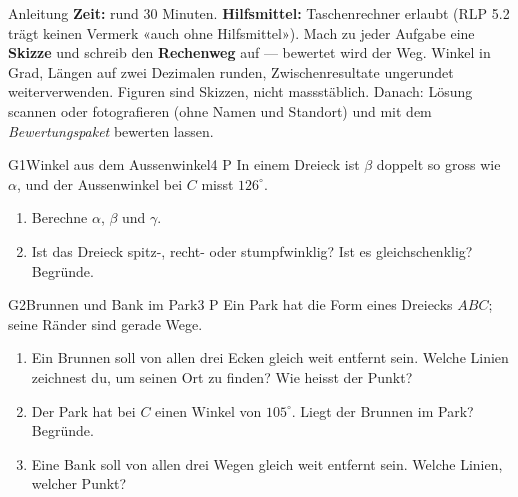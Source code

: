 \documentclass[11pt]{article}
\begin{document}

\begin{lpinfo}{Anleitung}
\textbf{Zeit:} rund 30 Minuten. \textbf{Hilfsmittel:} Taschenrechner erlaubt (RLP 5.2 trägt keinen Vermerk «auch ohne Hilfsmittel»).
Mach zu jeder Aufgabe eine \textbf{Skizze} und schreib den \textbf{Rechenweg} auf — bewertet wird der Weg. Winkel in Grad,
Längen auf zwei Dezimalen runden, Zwischenresultate ungerundet weiterverwenden. Figuren sind Skizzen, nicht massstäblich.
Danach: Lösung scannen oder fotografieren (ohne Namen und Standort) und mit dem \emph{Bewertungspaket} bewerten lassen.
\end{lpinfo}


\begin{lpaufgabe}{G1}{Winkel aus dem Aussenwinkel}{4 P}
In einem Dreieck ist $\beta$ doppelt so gross wie $\alpha$, und der Aussenwinkel bei $C$ misst $126^\circ$.
\begin{enumerate}[label=(\alph*),leftmargin=*,itemsep=2pt]
\item Berechne $\alpha$, $\beta$ und $\gamma$.
\item Ist das Dreieck spitz-, recht- oder stumpfwinklig? Ist es gleichschenklig? Begründe.
\end{enumerate}
\end{lpaufgabe}

\begin{lpaufgabe}{G2}{Brunnen und Bank im Park}{3 P}
Ein Park hat die Form eines Dreiecks $ABC$; seine Ränder sind gerade Wege.
\begin{enumerate}[label=(\alph*),leftmargin=*,itemsep=2pt]
\item Ein Brunnen soll von allen drei Ecken gleich weit entfernt sein. Welche Linien zeichnest du, um seinen Ort zu finden? Wie heisst der Punkt?
\item Der Park hat bei $C$ einen Winkel von $105^\circ$. Liegt der Brunnen im Park? Begründe.
\item Eine Bank soll von allen drei Wegen gleich weit entfernt sein. Welche Linien, welcher Punkt?
\end{enumerate}
\end{lpaufgabe}
\end{document}
